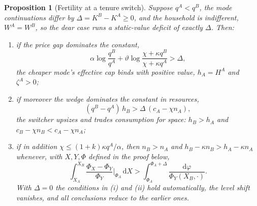 \documentclass[11pt]{article}
\newtheorem{proposition}{Proposition}
\newcommand{\dd}{\mathrm d}
\newcommand{\1}{\mathbf 1}
\begin{document}
\begin{proposition}[Fertility at a tenure switch]
\label{prop:tenure_switch_fertility}
Suppose $q^A<q^B$, the mode continuations differ by $\Delta=K^B-K^A\ge0$, and the household is indifferent, $W^A=W^B$, so the dear case runs a static-value deficit of exactly $\Delta$. Then:
\begin{enumerate}[label=(\roman*)]
\item if the price gap dominates the constant,
\[
\alpha\log\frac{q^B}{q^A}+\vartheta\log\frac{\chi+\kappa q^B}{\chi+\kappa q^A}>\Delta,
\]
the cheaper mode's effective cap binds with positive value, $h_A=H^A$ and $\zeta^A>0$;
\item if moreover the wedge dominates the constant in resources,
\[
(q^B-q^A)\,h_B>\Delta\,(c_A-\chi n_A),
\]
the switcher upsizes and trades consumption for space: $h_B>h_A$ and $c_B-\chi n_B<c_A-\chi n_A$;
\item if in addition $\chi\le(1+k)\kappa q^A/\alpha$, then $n_B>n_A$ and $h_B-\kappa n_B>h_A-\kappa n_A$ whenever, with $X,Y,\Phi$ defined in the proof below,
\[
\int_{X_A}^{X_B}
\frac{\Phi_X-\Phi_Y}{\Phi_Y}\bigg|_{\Phi_A}\,\dd X
>
\int_{\Phi_A}^{\Phi_A+\Delta}
\frac{\dd\varphi}{\Phi_Y(X_B,\cdot)}.
\]
With $\Delta=0$ the conditions in (i) and (ii) hold automatically, the level shift vanishes, and all conclusions reduce to the earlier ones.
\end{enumerate}
\end{proposition}
\end{document}
